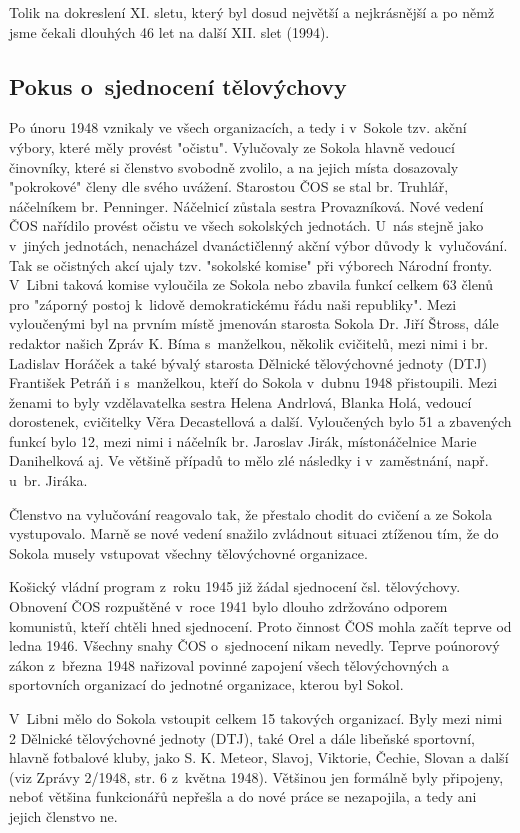 \documentclass[a5paper, 11pt, twoside]{article}
\begin{document}
Tolik na dokreslení XI. sletu, který byl dosud největší a nejkrásnější a
po němž jsme čekali dlouhých 46 let na další XII. slet (1994).

\subsection{Pokus o~sjednocení
tělovýchovy}

Po únoru 1948 vznikaly ve všech organizacích, a tedy i v~Sokole tzv.
akční výbory, které měly provést "očistu". Vylučovaly ze Sokola hlavně
vedoucí činovníky, které si členstvo svobodně zvolilo, a na jejich místa
dosazovaly "pokrokové" členy dle svého uvážení. Starostou ČOS se stal
br. Truhlář, náčelníkem br. Penninger. Náčelnicí zůstala sestra
Provazníková. Nové vedení ČOS nařídilo provést očistu ve všech
sokolských jednotách. U~nás stejně jako v~jiných jednotách, nenacházel
dvanáctičlenný akční výbor důvody k~vylučování. Tak se očistných akcí
ujaly tzv. "sokolské komise" při výborech Národní fronty. V~Libni
taková komise vyloučila ze Sokola nebo zbavila funkcí celkem 63 členů
pro "záporný postoj k~lidově demokratickému řádu naši republiky". Mezi
vyloučenými byl na prvním místě jmenován starosta Sokola Dr. Jiří
Štross, dále redaktor našich Zpráv K. Bíma s~manželkou, několik
cvičitelů, mezi nimi i br. Ladislav Horáček a také bývalý starosta
Dělnické tělovýchovné jednoty (DTJ) František Petráň i s~manželkou,
kteří do Sokola v~dubnu 1948 přistoupili. Mezi ženami to byly
vzdělavatelka sestra Helena Andrlová, Blanka Holá, vedoucí dorostenek,
cvičitelky Věra Decastellová a další. Vyloučených bylo 51 a zbavených
funkcí bylo 12, mezi nimi i náčelník br. Jaroslav Jirák, místonáčelnice
Marie Danihelková aj. Ve většině případů to mělo zlé následky i
v~zaměstnání, např. u~br. Jiráka.

Členstvo na vylučování reagovalo tak, že přestalo chodit do cvičení a ze
Sokola vystupovalo. Marně se nové vedení snažilo zvládnout situaci
ztíženou tím, že do Sokola musely vstupovat všechny tělovýchovné
organizace.

Košický vládní program z~roku 1945 již žádal sjednocení čsl.
tělovýchovy. Obnovení ČOS rozpuštěné v~roce 1941 bylo dlouho zdržováno
odporem komunistů, kteří chtěli hned sjednocení. Proto činnost ČOS mohla
začít teprve od ledna 1946. Všechny snahy ČOS o~sjednocení nikam
nevedly. Teprve poúnorový zákon z~března 1948 nařizoval povinné zapojení
všech tělovýchovných a sportovních organizací do jednotné organizace,
kterou byl Sokol.

V~Libni mělo do Sokola vstoupit celkem 15 takových organizací. Byly mezi
nimi 2 Dělnické tělovýchovné jednoty (DTJ), také Orel a dále libeňské
sportovní, hlavně fotbalové kluby, jako S. K. Meteor, Slavoj, Viktorie,
Čechie, Slovan a další (viz Zprávy 2/1948, str. 6 z~května 1948).
Většinou jen formálně byly připojeny, neboť většina funkcionářů nepřešla
a do nové práce se nezapojila, a tedy ani jejich členstvo ne.
\end{document}
